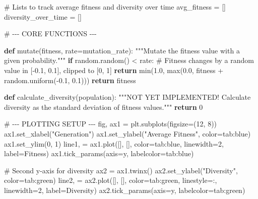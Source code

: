\documentclass[
  letterpaper,
  DIV=11,
  numbers=noendperiod]{scrreprt}
\newenvironment{Shaded}{\begin{snugshade}}{\end{snugshade}}
\newcommand{\BuiltInTok}[1]{\textcolor[rgb]{0.00,0.23,0.31}{#1}}
\newcommand{\CommentTok}[1]{\textcolor[rgb]{0.37,0.37,0.37}{#1}}
\newcommand{\ControlFlowTok}[1]{\textcolor[rgb]{0.00,0.23,0.31}{\textbf{#1}}}
\newcommand{\DecValTok}[1]{\textcolor[rgb]{0.68,0.00,0.00}{#1}}
\newcommand{\FloatTok}[1]{\textcolor[rgb]{0.68,0.00,0.00}{#1}}
\newcommand{\KeywordTok}[1]{\textcolor[rgb]{0.00,0.23,0.31}{\textbf{#1}}}
\newcommand{\NormalTok}[1]{\textcolor[rgb]{0.00,0.23,0.31}{#1}}
\newcommand{\OperatorTok}[1]{\textcolor[rgb]{0.37,0.37,0.37}{#1}}
\newcommand{\StringTok}[1]{\textcolor[rgb]{0.13,0.47,0.30}{#1}}
\theoremstyle{definition}
\theoremstyle{remark}
\begin{document}
\begin{tcolorbox}
\begin{Shaded}
\begin{Highlighting}[]
\CommentTok{\# Lists to track average fitness and diversity over time}
\NormalTok{avg\_fitness }\OperatorTok{=}\NormalTok{ []}
\NormalTok{diversity\_over\_time }\OperatorTok{=}\NormalTok{ []}

\CommentTok{\# {-}{-}{-} CORE FUNCTIONS {-}{-}{-}}

\KeywordTok{def}\NormalTok{ mutate(fitness, rate}\OperatorTok{=}\NormalTok{mutation\_rate):}
    \CommentTok{"""Mutate the fitness value with a given probability."""}
    \ControlFlowTok{if}\NormalTok{ random.random() }\OperatorTok{\textless{}}\NormalTok{ rate:}
        \CommentTok{\# Fitness changes by a random value in [{-}0.1, 0.1], clipped to [0, 1]}
        \ControlFlowTok{return} \BuiltInTok{min}\NormalTok{(}\FloatTok{1.0}\NormalTok{, }\BuiltInTok{max}\NormalTok{(}\FloatTok{0.0}\NormalTok{, fitness }\OperatorTok{+}\NormalTok{ random.uniform(}\OperatorTok{{-}}\FloatTok{0.1}\NormalTok{, }\FloatTok{0.1}\NormalTok{)))}
    \ControlFlowTok{return}\NormalTok{ fitness}

\KeywordTok{def}\NormalTok{ calculate\_diversity(population):}
    \CommentTok{"""NOT YET IMPLEMENTED! Calculate diversity as the standard deviation of fitness values."""}
    \ControlFlowTok{return} \DecValTok{0} 

\CommentTok{\# {-}{-}{-} PLOTTING SETUP {-}{-}{-}}
\NormalTok{fig, ax1 }\OperatorTok{=}\NormalTok{ plt.subplots(figsize}\OperatorTok{=}\NormalTok{(}\DecValTok{12}\NormalTok{, }\DecValTok{8}\NormalTok{))}
\NormalTok{ax1.set\_xlabel(}\StringTok{"Generation"}\NormalTok{)}
\NormalTok{ax1.set\_ylabel(}\StringTok{"Average Fitness"}\NormalTok{, color}\OperatorTok{=}\StringTok{\textquotesingle{}tab:blue\textquotesingle{}}\NormalTok{)}
\NormalTok{ax1.set\_ylim(}\DecValTok{0}\NormalTok{, }\DecValTok{1}\NormalTok{)}
\NormalTok{line1, }\OperatorTok{=}\NormalTok{ ax1.plot([], [], color}\OperatorTok{=}\StringTok{\textquotesingle{}tab:blue\textquotesingle{}}\NormalTok{, linewidth}\OperatorTok{=}\DecValTok{2}\NormalTok{, label}\OperatorTok{=}\StringTok{\textquotesingle{}Fitness\textquotesingle{}}\NormalTok{)}
\NormalTok{ax1.tick\_params(axis}\OperatorTok{=}\StringTok{\textquotesingle{}y\textquotesingle{}}\NormalTok{, labelcolor}\OperatorTok{=}\StringTok{\textquotesingle{}tab:blue\textquotesingle{}}\NormalTok{)}

\CommentTok{\# Second y{-}axis for diversity}
\NormalTok{ax2 }\OperatorTok{=}\NormalTok{ ax1.twinx()}
\NormalTok{ax2.set\_ylabel(}\StringTok{"Diversity"}\NormalTok{, color}\OperatorTok{=}\StringTok{\textquotesingle{}tab:green\textquotesingle{}}\NormalTok{)}
\NormalTok{line2, }\OperatorTok{=}\NormalTok{ ax2.plot([], [], color}\OperatorTok{=}\StringTok{\textquotesingle{}tab:green\textquotesingle{}}\NormalTok{, linestyle}\OperatorTok{=}\StringTok{\textquotesingle{}:\textquotesingle{}}\NormalTok{, linewidth}\OperatorTok{=}\DecValTok{2}\NormalTok{, label}\OperatorTok{=}\StringTok{\textquotesingle{}Diversity\textquotesingle{}}\NormalTok{)}
\NormalTok{ax2.tick\_params(axis}\OperatorTok{=}\StringTok{\textquotesingle{}y\textquotesingle{}}\NormalTok{, labelcolor}\OperatorTok{=}\StringTok{\textquotesingle{}tab:green\textquotesingle{}}\NormalTok{)}


\end{Highlighting}
\end{Shaded}
\end{tcolorbox}
\end{document}
